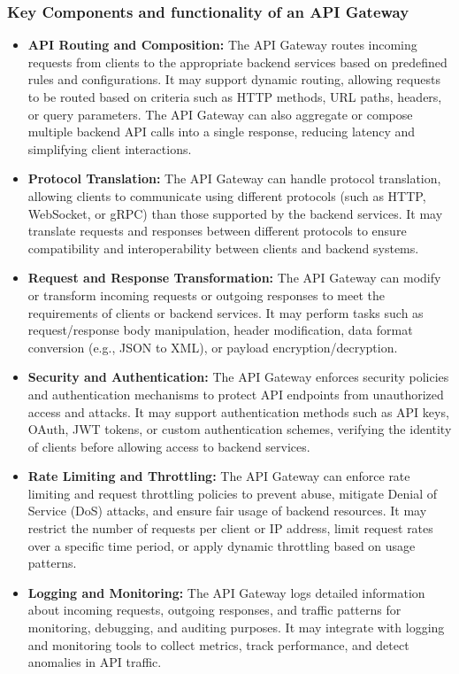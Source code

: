 \documentclass{article}
\begin{document}
\subsubsection{Key Components and functionality of an API Gateway}
\begin{itemize}
    \item \textbf{API Routing and Composition:} The API Gateway routes incoming requests from clients to the appropriate backend services based on predefined rules and configurations. It may support dynamic routing, allowing requests to be routed based on criteria such as HTTP methods, URL paths, headers, or query parameters. The API Gateway can also aggregate or compose multiple backend API calls into a single response, reducing latency and simplifying client interactions.
    \item \textbf{Protocol Translation:} The API Gateway can handle protocol translation, allowing clients to communicate using different protocols (such as HTTP, WebSocket, or gRPC) than those supported by the backend services. It may translate requests and responses between different protocols to ensure compatibility and interoperability between clients and backend systems.
    \item \textbf{Request and Response Transformation:} The API Gateway can modify or transform incoming requests or outgoing responses to meet the requirements of clients or backend services. It may perform tasks such as request/response body manipulation, header modification, data format conversion (e.g., JSON to XML), or payload encryption/decryption.
    \item \textbf{Security and Authentication:} The API Gateway enforces security policies and authentication mechanisms to protect API endpoints from unauthorized access and attacks. It may support authentication methods such as API keys, OAuth, JWT tokens, or custom authentication schemes, verifying the identity of clients before allowing access to backend services.
    \item \textbf{Rate Limiting and Throttling:} The API Gateway can enforce rate limiting and request throttling policies to prevent abuse, mitigate Denial of Service (DoS) attacks, and ensure fair usage of backend resources. It may restrict the number of requests per client or IP address, limit request rates over a specific time period, or apply dynamic throttling based on usage patterns.
    \item \textbf{Logging and Monitoring:} The API Gateway logs detailed information about incoming requests, outgoing responses, and traffic patterns for monitoring, debugging, and auditing purposes. It may integrate with logging and monitoring tools to collect metrics, track performance, and detect anomalies in API traffic.

\end{itemize}
\end{document}
